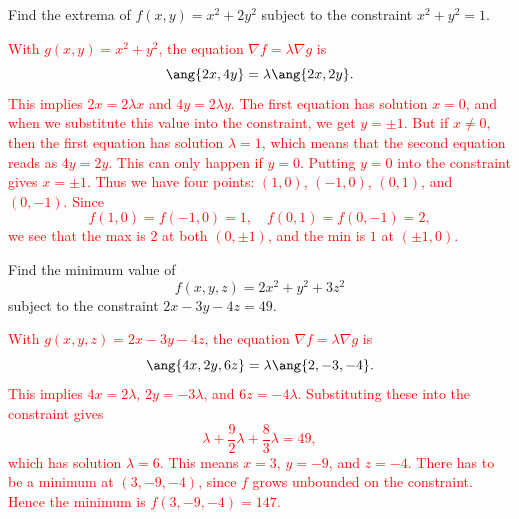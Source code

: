 \documentclass[12pt,reqno]{amsart}
\begin{document}
\newpage
\prob Find the extrema of $f(x,y) = x^2+2y^2$ subject to the constraint $x^2+y^2 = 1$.

\bigskip
\textcolor{red}{With $g(x,y) = x^2+y^2$, the equation $\nabla f = \lambda \nabla g$ is
	\[\ang{2x,4y} = \lambda \ang{2x,2y}.
	\]
This implies $2x = 2\lambda x$ and $4y = 2\lambda y$. The first equation has solution $x=0$, and when we substitute this value into the constraint, we get $y = \pm 1$. But if $x\neq 0$, then the first equation has solution $\lambda =1$, which means that the second equation reads as $4y = 2y$. This can only happen if $y=0$. Putting $y=0$ into the constraint gives $x=\pm 1$. Thus we have four points: $(1,0)$, $(-1,0)$, $(0,1)$, and $(0,-1)$. Since
	\[f(1,0) =f(-1,0) =  1, \quad f(0,1) = f(0,-1) = 2,
	\]
we see that the max is $2$ at both $(0,\pm 1)$, and the min is $1$ at $(\pm 1,0)$.}
\bigskip

\prob Find the minimum value of
	\[f(x,y,z) = 2x^2 + y^2 + 3z^2
	\]
subject to the constraint $2x-3y-4z=49$.

\bigskip
\textcolor{red}{With $g(x,y,z) = 2x-3y-4z$, the equation $\nabla f = \lambda \nabla g$ is
	\[\ang{4x,2y,6z} = \lambda \ang{2,-3,-4}.
	\]
This implies $4x = 2\lambda$, $2y = -3\lambda$, and $6z = -4\lambda$. Substituting these into the constraint gives
	\[\lambda + \frac{9}{2}\lambda + \frac{8}{3} \lambda = 49,
	\]
which has solution $\lambda = 6$. This means $x = 3$, $y = -9$, and $z = -4$. There has to be a minimum at $(3,-9,-4)$, since $f$ grows unbounded on the constraint. Hence the minimum is $f(3,-9,-4)=147$.}
\end{document}
